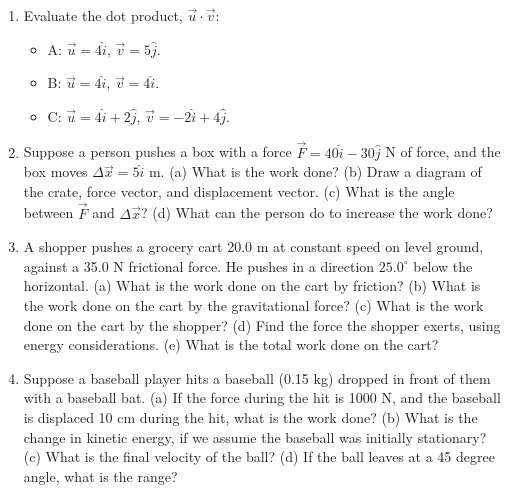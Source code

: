 \documentclass{article}
\begin{document}
\begin{enumerate}
\item Evaluate the dot product, $\vec{u} \cdot \vec{v}$:
\begin{itemize}
\item A: $\vec{u} = 4\hat{i}$, $\vec{v} = 5 \hat{j}$.
\item B: $\vec{u} = 4\hat{i}$, $\vec{v} = 4 \hat{i}$.
\item C: $\vec{u} = 4\hat{i}+2\hat{j}$, $\vec{v} = -2\hat{i} + 4 \hat{j}$.
\end{itemize}
\item Suppose a person pushes a box with a force $\vec{F} = 40 \hat{i} - 30 \hat{j}$ N of force, and the box moves $\Delta \vec{x} = 5\hat{i}$ m.  (a) What is the work done? (b) Draw a diagram of the crate, force vector, and displacement vector. (c) What is the angle between $\vec{F}$ and $\Delta \vec{x}$? (d) What can the person do to increase the work done? \\ \vspace{4cm}
\item A shopper pushes a grocery cart 20.0 m at constant speed on level ground, against a 35.0 N frictional force. He pushes in a direction $25.0^{\circ}$ below the horizontal. (a) What is the work done on the cart by friction? (b) What is the work done on the cart by the gravitational force? (c) What is the work done on the cart by the shopper? (d) Find the force the shopper exerts, using energy considerations. (e) What is the total work done on the cart? \\ \vspace{4cm}
\item Suppose a baseball player hits a baseball (0.15 kg) dropped in front of them with a baseball bat.  (a) If the force during the hit is 1000 N, and the baseball is displaced 10 cm during the hit, what is the work done? (b) What is the change in kinetic energy, if we assume the baseball was initially stationary? (c) What is the final velocity of the ball? (d) If the ball leaves at a 45 degree angle, what is the range?
\end{enumerate}
\end{document}
